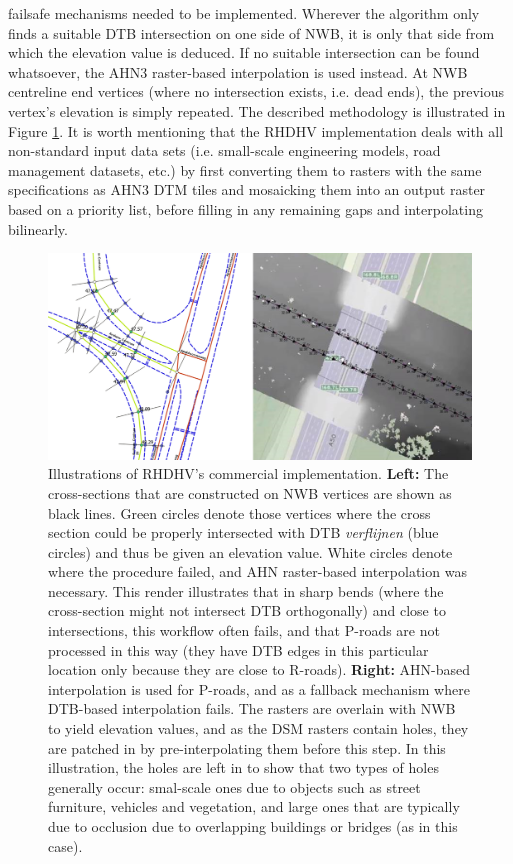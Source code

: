 failsafe mechanisms needed to be implemented. Wherever the algorithm only finds a suitable DTB intersection on one side of NWB, it is only that side from which the elevation value is deduced. If no suitable intersection can be found whatsoever, the AHN3 raster-based interpolation is used instead. At NWB centreline end vertices (where no intersection exists, i.e. dead ends), the previous vertex’s elevation is simply repeated. The described methodology is illustrated in Figure \ref{fig:rhdhv}. It is worth mentioning that the RHDHV implementation deals with all non-standard input data sets (i.e. small-scale engineering models, road management datasets, etc.) by first converting them to rasters with the same specifications as AHN3 DTM tiles and mosaicking them into an output raster based on a priority list, before filling in any remaining gaps and interpolating bilinearly.

\begin{figure}[h]
    \centering
    \includegraphics[width=\linewidth]{p2/figs/rhdhv_combined.png} 
    \caption{Illustrations of RHDHV's commercial implementation. \textbf{Left:} The cross-sections that are constructed on NWB vertices are shown as black lines. Green circles denote those vertices where the cross section could be properly intersected with DTB \textit{verflijnen} (blue circles) and thus be given an elevation value. White circles denote where the procedure failed, and AHN raster-based interpolation was necessary. This render illustrates that in sharp bends (where the cross-section might not intersect DTB orthogonally) and close to intersections, this workflow often fails, and that P-roads are not processed in this way (they have DTB edges in this particular location only because they are close to R-roads). \textbf{Right:} AHN-based interpolation is used for P-roads, and as a fallback mechanism where DTB-based interpolation fails. The rasters are overlain with NWB to yield elevation values, and as the DSM rasters contain holes, they are patched in by pre-interpolating them before this step. In this illustration, the holes are left in to show that two types of holes generally occur: smal-scale ones due to objects such as street furniture, vehicles and vegetation, and large ones that are typically due to occlusion due to overlapping buildings or bridges (as in this case).}
    \label{fig:rhdhv}
\end{figure}

